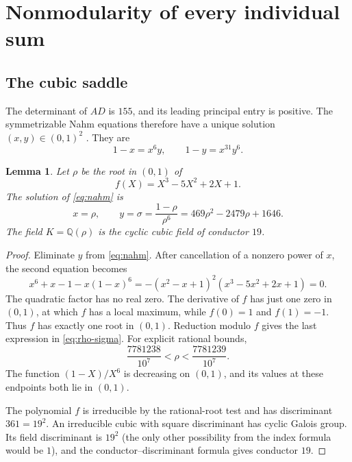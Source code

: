 \documentclass[11pt,reqno]{amsart}
\newcommand{\QQ}{\mathbb Q}
\newtheorem{lemma}[theorem]{Lemma}
\theoremstyle{remark}
\numberwithin{equation}{section}
\begin{document}
\section{Nonmodularity of every individual sum}\label{sec:exclusion}
\subsection{The cubic saddle}
The determinant of $AD$ is $155$, and its leading principal entry is
positive. The symmetrizable Nahm equations therefore have a unique
solution $(x,y)\in(0,1)^2$ \cite[Section~2.1]{Mizuno}. They are
\begin{equation}\label{eq:nahm}
 1-x=x^6y,\qquad 1-y=x^{31}y^6.
\end{equation}

\begin{lemma}\label{lem:saddle}
Let $\rho$ be the root in $(0,1)$ of
\begin{equation}\label{eq:cubic}
 f(X)=X^3-5X^2+2X+1.
\end{equation}
The solution of \eqref{eq:nahm} is
\begin{equation}\label{eq:rho-sigma}
 x=\rho,\qquad
 y=\sigma=\frac{1-\rho}{\rho^6}
       =469\rho^2-2479\rho+1646.
\end{equation}
The field $K=\QQ(\rho)$ is the cyclic cubic field of conductor $19$.
\end{lemma}
\begin{proof}
Eliminate $y$ from \eqref{eq:nahm}. After cancellation of a nonzero
power of $x$, the second equation becomes
\[
 x^6+x-1-x(1-x)^6
 =-(x^2-x+1)^2(x^3-5x^2+2x+1)=0.
\]
The quadratic factor has no real zero. The derivative of $f$ has just
one zero in $(0,1)$, at which $f$ has a local maximum, while
$f(0)=1$ and $f(1)=-1$. Thus $f$ has exactly one root in $(0,1)$.
Reduction modulo $f$ gives the last expression in
\eqref{eq:rho-sigma}. For explicit rational bounds,
\[
 \frac{7781238}{10^7}<\rho<\frac{7781239}{10^7}.
\]
The function $(1-X)/X^6$ is decreasing on $(0,1)$, and its values at
these endpoints both lie in $(0,1)$.

The polynomial $f$ is irreducible by the rational-root test and has
discriminant $361=19^2$. An irreducible cubic with square discriminant
has cyclic Galois group. Its field discriminant is $19^2$ (the only
other possibility from the index formula would be $1$), and the
conductor--discriminant formula gives conductor $19$.
\end{proof}
\end{document}
